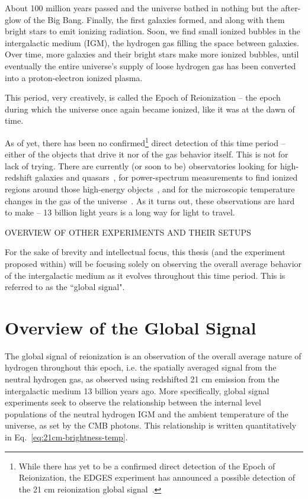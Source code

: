 About 100 million years passed and the universe bathed in nothing but the 
after-glow of the Big Bang. Finally, the first galaxies formed, and along with 
them bright stars to emit ionizing radiation. Soon, we find small ionized 
bubbles in the intergalactic medium (IGM), the hydrogen gas filling the space 
between galaxies. Over time, more galaxies and their bright stars make more 
ionized bubbles, until eventually the entire universe's supply of loose 
hydrogen gas has been converted into a proton-electron ionized plasma.

This period, very creatively, is called the Epoch of Reionization -- the epoch 
during which the universe once again became ionized, like it was at the dawn of 
time.

As of yet, there has been no confirmed\footnote{While there has yet to be a 
confirmed direct detection of the Epoch of Reionization, the EDGES experiment 
has announced a possible detection of the 21 cm reionization global 
signal~\citep{bowman2018}.} direct detection of this time period -- either of 
the objects that drive it nor of the gas behavior itself.  This is not for lack 
of trying.  There are currently (or soon to be) observatories looking for 
high-redshift galaxies and quasars~\citep{gardner2006}, for power-spectrum 
measurements to find ionized regions around those high-energy 
objects~\citep{deboer2017}, and for the microscopic temperature changes in the 
gas of the universe~\citep{bowman2010}.  As it turns out, these observations 
are hard to make -- 13 billion light years is a long way for light to travel.

OVERVIEW OF OTHER EXPERIMENTS AND THEIR SETUPS

For the sake of brevity and intellectual focus, this thesis (and the experiment 
proposed within) will be focusing solely on observing the overall average 
behavior of the intergalactic medium as it evolves throughout this time period.  
This is referred to as the ``global signal".

\section{Overview of the Global Signal}
\label{sec:global-signal-overview}

The global signal of reionization is an observation of the overall average 
nature of hydrogen throughout this epoch, i.e. the spatially averaged signal 
from the neutral hydrogen gas, as observed using redshifted 21 cm emission from 
the intergalactic medium 13 billion years ago. More specifically, global signal 
experiments seek to observe the relationship between the internal level 
populations of the neutral hydrogen IGM and the ambient temperature of the 
universe, as set by the CMB photons.  This relationship is written 
quantitatively in Eq.~\eqref{eq:21cm-brightness-temp}.

